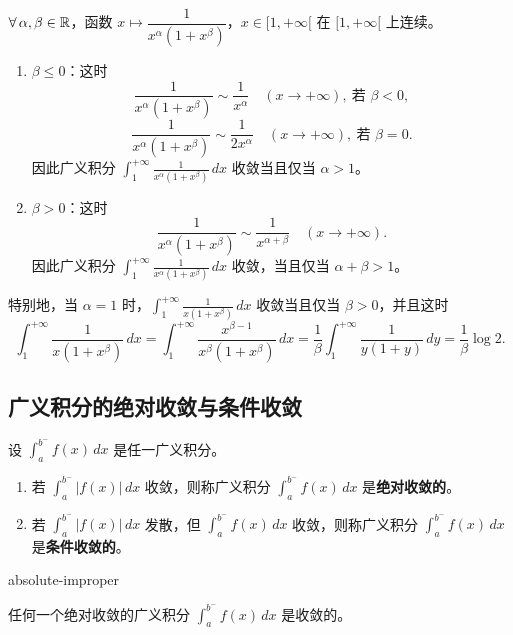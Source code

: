 $\forall\,\alpha,\beta\in\mathbb{R}$，函数 $x\longmapsto\dfrac{1}{x^{\alpha}(1+x^{\beta})}$，$x\in[1,+\infty[$ 在 $[1,+\infty[$ 上连续。

\begin{enumerate}[label=\arabic{enumi})]
\item $\beta\leqslant0$：这时
\[\frac{1}{x^{\alpha}(1+x^{\beta})}\sim\frac{1}{x^{\alpha}}\quad(x\to+\infty),\ \text{若 }\beta<0,\]
\[\frac{1}{x^{\alpha}(1+x^{\beta})}\sim\frac{1}{2x^{\alpha}}\quad(x\to+\infty),\ \text{若 }\beta=0.\]
因此广义积分 $\displaystyle\int_1^{+\infty}\frac{1}{x^{\alpha}(1+x^{\beta})}\,dx$ 收敛当且仅当 $\alpha>1$。
\item $\beta>0$：这时
\[\frac{1}{x^{\alpha}(1+x^{\beta})}\sim\frac{1}{x^{\alpha+\beta}}\quad(x\to+\infty).\]
因此广义积分 $\displaystyle\int_1^{+\infty}\frac{1}{x^{\alpha}(1+x^{\beta})}\,dx$ 收敛，当且仅当 $\alpha+\beta>1$。
\end{enumerate}

特别地，当 $\alpha=1$ 时，$\displaystyle\int_1^{+\infty}\frac{1}{x(1+x^{\beta})}\,dx$ 收敛当且仅当 $\beta>0$，并且这时
\[\int_1^{+\infty}\frac{1}{x(1+x^{\beta})}\,dx=\int_1^{+\infty}\frac{x^{\beta-1}}{x^{\beta}(1+x^{\beta})}\,dx=\frac{1}{\beta}\int_1^{+\infty}\frac{1}{y(1+y)}\,dy=\frac{1}{\beta}\log2.\]

\subsection{广义积分的绝对收敛与条件收敛}

\begin{mydef*}{}

设 $\displaystyle\int_a^{b^-}f(x)\,dx$ 是任一广义积分。

\begin{enumerate}[label=\arabic{enumi})]
\item 若 $\displaystyle\int_a^{b^-}|f(x)|\,dx$ 收敛，则称广义积分 $\displaystyle\int_a^{b^-}f(x)\,dx$ 是\textbf{绝对收敛的}。
\item 若 $\displaystyle\int_a^{b^-}|f(x)|\,dx$ 发散，但 $\displaystyle\int_a^{b^-}f(x)\,dx$ 收敛，则称广义积分 $\displaystyle\int_a^{b^-}f(x)\,dx$ 是\textbf{条件收敛的}。
\end{enumerate}

\end{mydef*}

\begin{mythm}{}{absolute-improper}

任何一个绝对收敛的广义积分 $\displaystyle\int_a^{b^-}f(x)\,dx$ 是收敛的。

\end{mythm}

